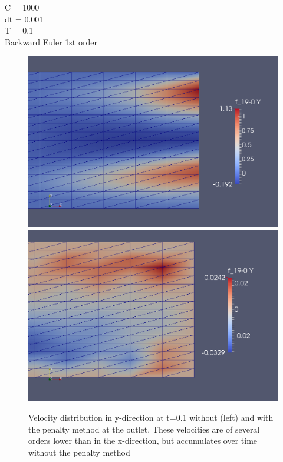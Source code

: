 C = 1000 \\
dt = 0.001 \\
T = 0.1 \\
Backward Euler 1st order \\
\begin{figure}[!ht]
\begin{center}
\includegraphics[width=0.48\linewidth]{figures/Womersley_no_penalty_BE_01}\hspace{0.04\linewidth}\includegraphics[width=0.48\linewidth]{figures/Womersley_penalty_BE_01}
\caption{Velocity distribution in y-direction at t=0.1 without (left) and with the penalty method at the outlet. These velocities are of several orders lower than in the x-direction, but accumulates over time without the penalty method}
\end{center}
\end{figure}


